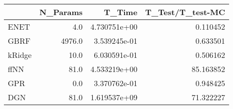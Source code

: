 \begin{tabular}{lrrr}
\toprule
{} &  N\_Params &        T\_Time &  T\_Test/T\_test-MC \\
\midrule
ENET   &       4.0 &  4.730751e+00 &          0.110452 \\
GBRF   &    4976.0 &  3.539245e-01 &          0.633501 \\
kRidge &      10.0 &  6.030591e-01 &          0.506162 \\
ffNN   &      81.0 &  4.533219e+00 &         85.163852 \\
GPR    &       0.0 &  3.370762e-01 &          0.948425 \\
DGN    &      81.0 &  1.619537e+09 &         71.322227 \\
\bottomrule
\end{tabular}
